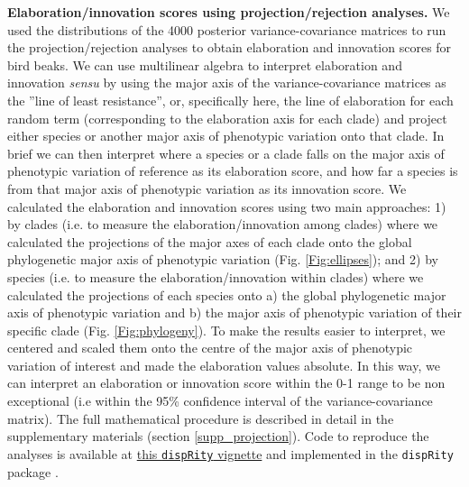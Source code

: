 \documentclass[12pt,letterpaper]{article}
\begin{document}
\textbf{Elaboration/innovation scores using projection/rejection analyses.}
We used the distributions of the 4000 posterior variance-covariance matrices to run the projection/rejection analyses to obtain  elaboration and innovation scores for bird beaks.
We can use multilinear algebra to interpret elaboration and innovation \textit{sensu} \cite{endler2005animal} by using the major axis of the variance-covariance matrices as the ''line of least resistance'', or, specifically here, the line of elaboration for each random term (corresponding to the elaboration axis for each clade) and project either species or another major axis of phenotypic variation onto that clade.
In brief we can then interpret where a species or a clade falls on the major axis of phenotypic variation of reference as its elaboration score, and how far a species is from that major axis of phenotypic variation as its innovation score.
We calculated the elaboration and innovation scores using two main approaches:
1) by clades (i.e. to measure the elaboration/innovation among clades) where we calculated the projections of the major axes of each clade onto the global phylogenetic major axis of phenotypic variation (Fig. \ref{Fig:ellipses});
and 2) by species (i.e. to measure the elaboration/innovation within clades) where we calculated the projections of each species onto a) the global phylogenetic major axis of phenotypic variation and b) the major axis of phenotypic variation of their specific clade (Fig. \ref{Fig:phylogeny}).
To make the results easier to interpret, we centered and scaled them onto the centre of the major axis of phenotypic variation of interest and made the elaboration values absolute.
In this way, we can interpret an elaboration or innovation score within the 0-1 range to be non exceptional (i.e within the 95\% confidence interval of the variance-covariance matrix).
The full mathematical procedure is described in detail in the supplementary materials (section \ref{supp_projection}).
Code to reproduce the analyses is available at \href{https://raw.rawgit.net/TGuillerme/dispRity/master/inst/vignettes/Projection_analysis.html}{this \texttt{dispRity} vignette} %
and implemented in the \texttt{dispRity} package \cite{dispRity}.
\end{document}
